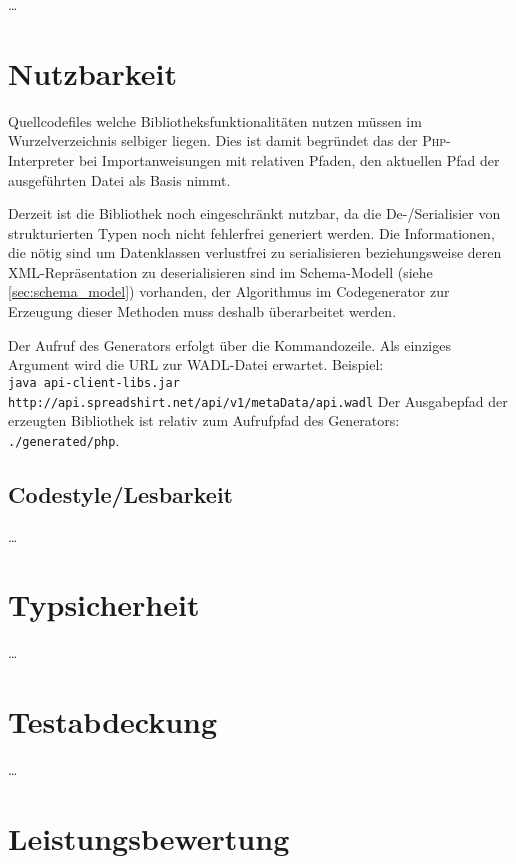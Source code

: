 \ldots

\section{Nutzbarkeit}
\label{sec:usability}

Quellcodefiles welche Bibliotheksfunktionalitäten nutzen müssen im Wurzelverzeichnis selbiger liegen. Dies ist damit begründet das der \textsc{Php}-Interpreter bei Importanweisungen mit relativen Pfaden, den aktuellen Pfad der ausgeführten Datei als Basis nimmt.

Derzeit ist die Bibliothek noch eingeschränkt nutzbar, da die De-/Serialisier von strukturierten Typen noch nicht fehlerfrei generiert werden. Die Informationen, die nötig sind um Datenklassen verlustfrei zu serialisieren beziehungsweise deren \gls{XML}-Repräsentation zu deserialisieren sind im Schema-Modell (siehe \cref{sec:schema_model}) vorhanden, der Algorithmus im Codegenerator zur Erzeugung dieser Methoden muss deshalb überarbeitet werden.

Der Aufruf des Generators erfolgt über die Kommandozeile. Als einziges Argument wird die \gls{URL} zur \gls{WADL}-Datei erwartet. Beispiel:\\ 
\texttt{java api-client-libs.jar http://api.spreadshirt.net/api/v1/metaData/api.wadl}
Der Ausgabepfad der erzeugten Bibliothek ist relativ zum Aufrufpfad des Generators: \texttt{./generated/php}.

\subsection{Codestyle/Lesbarkeit}
\label{se:code_style_readability}

\ldots

\section{Typsicherheit}
\label{sec:type_safety}

\ldots

\section{Testabdeckung}
\label{sec:test_coverage}

\ldots

\section{Leistungsbewertung}
\label{sec:performance_measurement}

